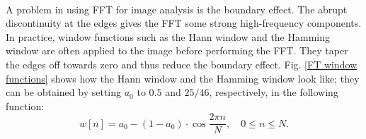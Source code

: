 \documentclass[12pt, twocolumn]{report}
\begin{document}
\paragraph{}
A problem in using FFT for image analysis is the boundary effect. The abrupt discontinuity at the edges gives the FFT some strong high-frequency components. In practice, window functions such as the Hann window and the Hamming window are often applied to the image before performing the FFT. They taper the edges off towards zero and thus reduce the boundary effect. Fig. \ref{FT window functions} shows how the Hann window and the Hamming window look like; they can be obtained by setting $a_0$ to $0.5$ and $25/46$, respectively, in the following function:
\begin{equation}
    w[n] = a_0 - (1-a_0)\cdot \cos{\frac{2\pi n}{N}}, \quad 0\leq n \leq N.
\end{equation}
\end{document}
